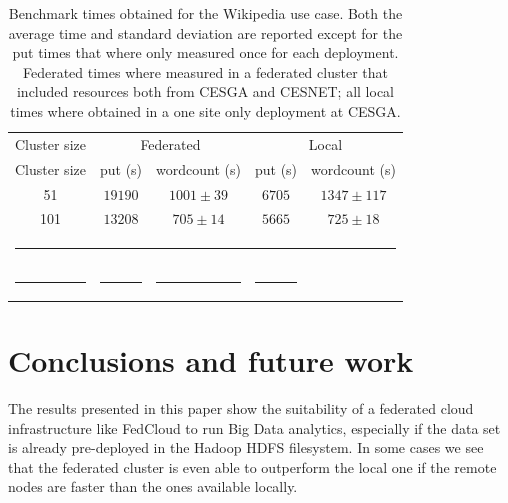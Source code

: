 \documentclass[oribibl]{llncs_Ibergrid2013}
\begin{document}
\begin{table}[h!]
\caption{Benchmark times obtained for the Wikipedia use case. Both the average time and standard deviation are reported except for the put times that where only measured once for each deployment. Federated times where measured in a federated cluster that included resources both from CESGA and CESNET; all local times where obtained in a one site only deployment at CESGA. }
\label{table:wikipedia}
%
\vspace{-0.5em}
%
\begin{center}
\begin{tabular}{ccccc}
\toprule
Cluster size				& \multicolumn{2}{c}{Federated} 		& \multicolumn{2}{c}{Local} \\
Cluster size				& put (s)		& wordcount (s) 	& put (s)		& wordcount (s)\\
\midrule
51                   			& $19190$		& $1001\pm39$      	& $6705$		& $1347\pm117$\\
101                  			& $13208$		& $705\pm14$      	& $5665$		& $725\pm18$\\
%
\bottomrule
\multicolumn{5}{c}{\rule{0.98\textwidth}{0em}}\\
\rule{0.3\textwidth}{0cm} & \rule{0.2\textwidth}{0cm} & \rule{0.2\textwidth}{0cm} &  \rule{0.2\textwidth}{0cm} & \\
\end{tabular}
\end{center}
\end{table}



\section{Conclusions and future work}
\label{sect-conclusions}
The results presented in this paper show the suitability of a federated cloud infrastructure like FedCloud to run Big Data analytics, especially if the data set is already pre-deployed in the Hadoop HDFS filesystem. In some cases we see that the federated cluster is even able to outperform the local one if the remote nodes are faster than the ones available locally.
\end{document}
